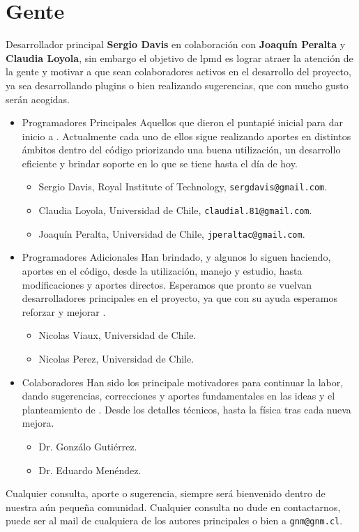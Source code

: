 \chapter{Gente}
\label{chap:auth}

Desarrollador principal \textbf{Sergio Davis} en colaboraci\'on con \textbf{Joaqu\'in Peralta} y \textbf{Claudia Loyola}, sin embargo el objetivo de lpmd es lograr atraer la atenci\'on de la gente y motivar a que sean colaboradores activos en el desarrollo del proyecto, ya sea desarrollando plugins o bien realizando sugerencias, que con mucho gusto ser\'an acogidas.

\begin{itemize}

\item {Programadores Principales} Aquellos que dieron el puntapi\'e inicial para dar inicio a {\lpmd}. Actualmente cada uno de ellos sigue realizando aportes en distintos \'ambitos dentro del c\'odigo priorizando una buena utilizaci\'on, un desarrollo eficiente y brindar soporte en lo que se tiene hasta el d\'ia de hoy.

\begin{itemize}
 \item Sergio Davis, Royal Institute of Technology, \verb|sergdavis@gmail.com|.
 \item Claudia Loyola, Universidad de Chile, \verb|claudial.81@gmail.com|.
 \item Joaqu\'in Peralta, Universidad de Chile, \verb|jperaltac@gmail.com|.
\end{itemize}

\item {Programadores Adicionales} Han brindado, y algunos lo siguen haciendo, aportes en el c\'odigo, desde la utilizaci\'on, manejo y estudio, hasta modificaciones y aportes directos. Esperamos que pronto se vuelvan desarrolladores principales en el proyecto, ya que con su ayuda esperamos reforzar y mejorar {\lpmd}.

\begin{itemize}
 \item Nicolas Viaux, Universidad de Chile.
 \item Nicolas Perez, Universidad de Chile.
\end{itemize}

\item{Colaboradores} Han sido los principale motivadores para continuar la labor, dando sugerencias, correcciones y aportes fundamentales en las ideas y el planteamiento de {\lpmd}. Desde los detalles t\'ecnicos, hasta la f\'isica tras cada nueva mejora.

\begin{itemize}
 \item Dr. Gonz\'alo Guti\'errez.
 \item Dr. Eduardo Men\'endez.
\end{itemize}
\end{itemize}

Cualquier consulta, aporte o sugerencia, siempre ser\'a bienvenido dentro de nuestra a\'un peque\~na comunidad. Cualquier consulta no dude en contactarnos, puede ser al mail de cualquiera de los autores principales o bien a \verb|gnm@gnm.cl|.
